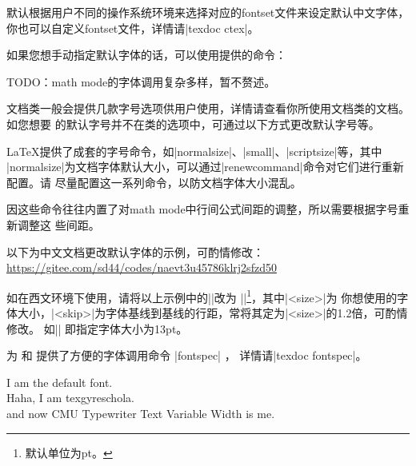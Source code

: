 默认根据用户不同的操作系统环境来选择对应的fontset文件来设定默认中文字体，
你也可以自定义fontset文件，详情请|texdoc ctex|。

如果您想手动指定默认字体的话，可以使用提供的命令：
\begin{texlist}
\end{texlist}

TODO：math mode的字体调用复杂多样，暂不赘述。


文档类一般会提供几款字号选项供用户使用，详情请查看你所使用文档类的文档。如您想要
的默认字号并不在类的选项中，可通过以下方式更改默认字号等。

\LaTeX{}提供了成套的字号命令，如|normalsize|、|small|、|scriptsize|等，其中
|normalsize|为文档字体默认大小，可以通过|renewcommand|命令对它们进行重新配置。请
尽量配置这一系列命令，以防文档字体大小混乱。

因这些命令往往内置了对math mode中行间公式间距的调整，所以需要根据字号重新调整这
些间距。

以下为中文文档更改默认字体的示例，可酌情修改：\\
\url{https://gitee.com/sd44/codes/naevt3u45786klrj2sfzd50}

如在西文环境下使用，请将以上示例中的|\zihao{}|改为
|\fontsize{<size>}{<skip>}\selectfont|\footnote{默认单位为pt。}，其中|<size>|为
你想使用的字体大小，|<skip>|为字体基线到基线的行距，常将其定为|<size>|的1.2倍，可酌情修改。
如|\fontsize{13}{14.5}\selectfont| 即指定字体大小为13pt。



为 \XeLaTeX{} 和 \LuaLaTeX{} 提供了方便的字体调用命令 |fontspec| ，
详情请|texdoc fontspec|。
\begin{texlist}
  \newfontfamily{}

  I am the default font. \\
   Haha, I am texgyreschola. \\
  \fontCMUtv and now CMU Typewriter Text Variable Width is me.
\end{texlist}

